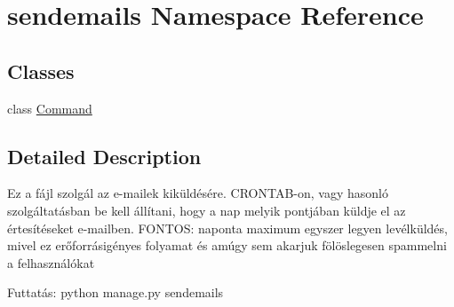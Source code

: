 \hypertarget{namespacesendemails}{}\section{sendemails Namespace Reference}
\label{namespacesendemails}
\subsection*{Classes}
\begin{DoxyCompactItemize}
\item 
class \mbox{\hyperlink{classsendemails_1_1_command}{Command}}
\end{DoxyCompactItemize}


\subsection{Detailed Description}
\begin{DoxyVerb}Ez a fájl szolgál az e-mailek kiküldésére.
CRONTAB-on, vagy hasonló szolgáltatásban be kell állítani, hogy a nap melyik pontjában
küldje el az értesítéseket e-mailben.
FONTOS: naponta maximum egyszer legyen levélküldés, mivel ez erőforrásigényes folyamat
és amúgy sem akarjuk fölöslegesen spammelni a felhasználókat

Futtatás: python manage.py sendemails
\end{DoxyVerb}
 